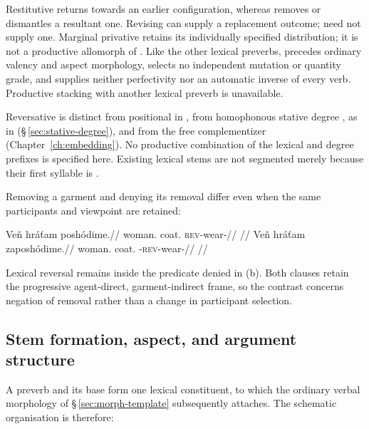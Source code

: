 Restitutive  returns towards an earlier configuration, whereas
 removes or dismantles a resultant one. Revising 
can supply a replacement outcome;  need not supply one.
Marginal privative  retains its individually specified distribution;
it is not a productive allomorph of .
Like the other lexical preverbs,  precedes ordinary valency and
aspect morphology, selects no independent mutation or quantity grade, and
supplies neither perfectivity nor an automatic inverse of every verb.
Productive stacking with another lexical preverb is unavailable.

Reversative  is distinct from positional  in
 , from homophonous stative degree 
, as in  
(§\,\ref{sec:stative-degree}), and from the free complementizer 
(Chapter~\ref{ch:embedding}). No productive combination of the lexical and
degree prefixes is specified here. Existing lexical stems are not segmented
merely because their first syllable is .


Removing a garment and denying its removal differ even when the same
participants and viewpoint are retained:

\pex\label{ex:deriv-slot-reversal}
\a
\begingl
\gla Veň hráťam poshódime.//
\glb woman.\Dir{} coat.\Ind{} \textsc{rev}-wear-\Prog{}//
\glft {}
//
\endgl
\a
\begingl
\gla Veň hráťam zaposhódime.//
\glb woman.\Dir{} coat.\Ind{} \Neg{}-\textsc{rev}-wear-\Prog{}//
\glft {}
//
\endgl
\xe

Lexical reversal remains inside the predicate denied in (b). Both clauses
retain the progressive agent-direct, garment-indirect frame, so the
contrast concerns negation of removal rather than a change in participant
selection.

\subsection{Stem formation, aspect, and argument structure}
\label{sec:preverb-aspect}

A preverb and its base form one lexical constituent, to which the ordinary
verbal morphology of §\,\ref{sec:morph-template} subsequently attaches. The
schematic organisation is therefore:

